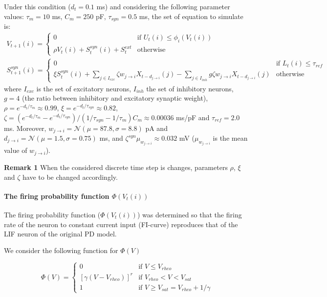\documentclass[11pt]{scrartcl}
\begin{document}
Under this condition (\(d_t=0.1\) ms) and considering the following parameter values: \(\tau_m = 10\) ms, \(C_m = 250\) pF, \(\tau_{syn} = 0.5\) ms, the set of equation to simulate is:
\begin{align}\label{eq:discrete-PD}
V_{t+1}(i) = \begin{cases}0 & \text{if } U_t(i) \le \phi_i\left(V_t(i)\right) \\
\rho V_{t}(i) + S_t^{syn}(i) + S_t^{ext} & \text{otherwise}   \end{cases} \\
S_{t+1}^{syn}(i) = \begin{cases}0 & \text{if } L_t(i) \le \tau_{ref} \\
\xi S_t^{syn}(i) + \sum_{j \in I_{exc}} \zeta w_{ j \to i} X_{t-d_{j\rightarrow i}}(j) - \sum_{j \in I_{inh}} g \zeta w_{ j \to i} X_{t-d_{j\rightarrow i}}(j) & \text{otherwise}   \end{cases}
\end{align}
where \(I_{exc}\) is the set of excitatory neurons, \(I_{inh}\) the set of inhibitory neurons, \(g=4\) (the ratio between inhibitory and excitatory synaptic weight), \(\rho=e^{-d_t/\tau_m}\approx0.99\), \(\xi=e^{-d_t/\tau_{syn}}\approx0.82\), \(\zeta=\left(e^{-d_t/\tau_m}-e^{-d_t/\tau_{syn}}\right)/\left(1/\tau_{syn}-1/\tau_m\right)C_m\approx0.00036\) ms/pF and \(\tau_{ref}=2.0\) ms. Moreover, \(w_{j\to i}=\mathcal{N}\left(\mu=87.8, \sigma=8.8\right)\) pA and \(d_{j\to i}=\mathcal{N}\left(\mu=1.5, \sigma=0.75\right)\) ms, and \(\zeta^{syn} \mu_{w_{j\to i}}\approx0.032\) mV (\(\mu_{w_{j\to i}}\) is the mean value of \(w_{j\to i}\)).


\textbf{Remark 1} When the considered discrete time step is changes, parameters \(\rho\), \(\xi\) and \(\zeta\) have to be changed accordingly.

\color{red}

\paragraph{The firing probability function $\Phi(V_t(i))$}

The firing probability function (\(\Phi(V_t(i))\)) was determined so that the firing rate of the neuron to constant current input (FI-curve) reproduces that of the LIF neuron of the original PD model.

We consider the following function for \(\Phi(V)\)

\begin{equation}
\Phi(V) = \begin{cases}
0 & \text{if $V \leq V_{rheo}$}\\
[\gamma(V-V_{rheo})]^r & \text{if $V_{rheo} < V < V_{sat}$} \\
1 & \text{if $V \geq V_{sat} = V_{rheo} + 1/\gamma$}
\end{cases}
\label{eq:phi_full}
\end{equation}
\end{document}
